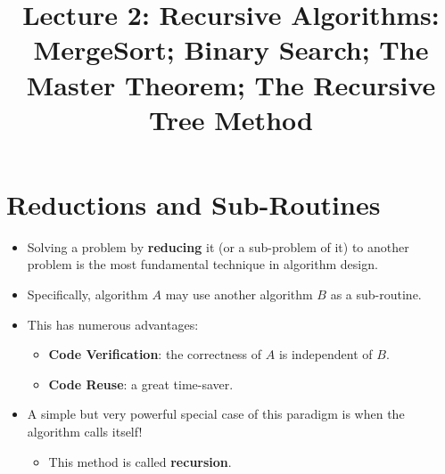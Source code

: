 \documentclass[12pt]{article}
\title{\huge Lecture 2: Recursive Algorithms: MergeSort; Binary Search; The Master Theorem; The Recursive Tree Method}
\author{}
\date{}
\begin{document}
\maketitle
\section{Reductions and Sub-Routines}
\renewcommand{\labelitemii}{$\circ$}
\renewcommand{\labelitemiii}{$\cdot$}
\renewcommand{\labelitemiii}{$\rightarrow$}
\renewcommand{\labelitemiv}{$\star$}
\begin{itemize}
\item Solving a problem by \textbf{reducing} it (or a sub-problem of it) to another problem is the most fundamental technique in algorithm design.
\item Specifically, algorithm $A$ may use another algorithm $B$ as a sub-routine.
\item This has numerous advantages:
	\begin{itemize}
	\item \textbf{Code Verification}: the correctness of $A$ is independent of $B$.
	\item \textbf{Code Reuse}: a great time-saver.
	\end{itemize}
\item A simple but very powerful special case of this paradigm is when the algorithm calls itself!
	\begin{itemize}
	\item This method is called \textbf{recursion}.
	\end{itemize}
\end{itemize}
\end{document}
